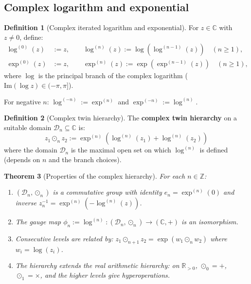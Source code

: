 \documentclass[12pt]{article}
\theoremstyle{plain}
\newtheorem{theorem}{Theorem}[section]
\theoremstyle{definition}
\newtheorem{definition}[theorem]{Definition}
\theoremstyle{remark}
\newcommand{\CC}{\mathbb{C}}
\newcommand{\RR}{\mathbb{R}}
\newcommand{\ZZ}{\mathbb{Z}}
\begin{document}
\subsection{Complex logarithm and exponential}

\begin{definition}[Complex iterated logarithm and exponential]\label{def:complex-iter}
For $z \in \CC$ with $z \neq 0$, define:
\begin{align}
\log^{(0)}(z) &:= z, \qquad \log^{(n)}(z) := \log(\log^{(n-1)}(z)) \quad (n \geq 1), \\
\exp^{(0)}(z) &:= z, \qquad \exp^{(n)}(z) := \exp(\exp^{(n-1)}(z)) \quad (n \geq 1),
\end{align}
where $\log$ is the principal branch of the complex logarithm ($\mathrm{Im}(\log z) \in (-\pi, \pi]$).

For negative $n$: $\log^{(-n)} := \exp^{(n)}$ and $\exp^{(-n)} := \log^{(n)}$.
\end{definition}

\begin{definition}[Complex twin hierarchy]\label{def:complex-twin}
The \textbf{complex twin hierarchy} on a suitable domain $\mathcal{D}_n \subseteq \CC$ is:
\begin{equation}\label{eq:complex-twin}
\boxed{z_1 \odot_n z_2 := \exp^{(n)}(\log^{(n)}(z_1) + \log^{(n)}(z_2))}
\end{equation}
where the domain $\mathcal{D}_n$ is the maximal open set on which $\log^{(n)}$ is defined (depends on $n$ and the branch choices).
\end{definition}

\begin{theorem}[Properties of the complex hierarchy]\label{thm:complex-props}
For each $n \in \ZZ$:
\begin{enumerate}[label=(\alph*)]
    \item $(\mathcal{D}_n, \odot_n)$ is a commutative group with identity $e_n = \exp^{(n)}(0)$ and inverse $z^{-1}_n = \exp^{(n)}(-\log^{(n)}(z))$.
    \item The gauge map $\phi_n := \log^{(n)}: (\mathcal{D}_n, \odot_n) \to (\CC, +)$ is an isomorphism.
    \item Consecutive levels are related by: $z_1 \odot_{n+1} z_2 = \exp(w_1 \odot_n w_2)$ where $w_i = \log(z_i)$.
    \item The hierarchy extends the real arithmetic hierarchy: on $\RR_{>0}$, $\odot_0 = +$, $\odot_1 = \times$, and the higher levels give hyperoperations.
\end{enumerate}
\end{theorem}
\end{document}
